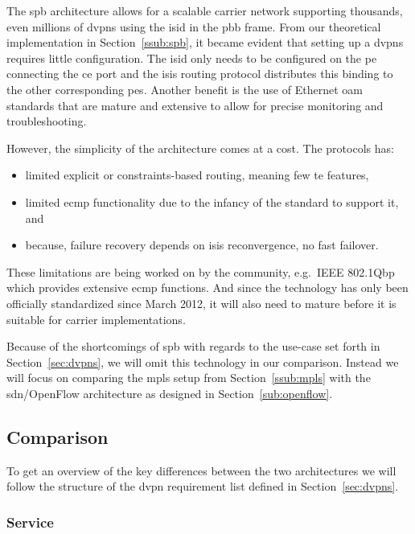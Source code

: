 The \ac{spb} architecture allows for a scalable carrier network supporting thousands, even millions of \acp{dvpn} using the \ac{isid} in the \ac{pbb} frame. From our theoretical implementation in Section~\ref{ssub:spb}, it became evident that setting up a \acp{dvpn} requires little configuration. The \ac{isid} only needs to be configured on the \ac{pe} connecting the \ac{ce} port and the \ac{isis} routing protocol distributes this binding to the other corresponding \acp{pe}. Another benefit is the use of Ethernet \ac{oam} standards that are mature and extensive to allow for precise monitoring and troubleshooting.

However, the simplicity of the architecture comes at a cost. The protocols has:
\begin{itemize}
	\item limited explicit or constraints-based routing, meaning few \ac{te} features,
	\item limited \ac{ecmp} functionality due to the infancy of the standard to support it, and
	\item because, failure recovery depends on \ac{isis} reconvergence, no fast failover.
\end{itemize}

These limitations are being worked on by the community, e.g.\ IEEE 802.1Qbp which provides extensive \ac{ecmp} functions. And since the technology has only been officially standardized since March 2012, it will also need to mature before it is suitable for carrier implementations.  

Because of the shortcomings of \ac{spb} with regards to the use-case set forth in Section~\ref{sec:dvpns}, we will omit this technology in our comparison. Instead we will focus on comparing the \ac{mpls} setup from Section~\ref{ssub:mpls} with the \acs{sdn}/OpenFlow architecture as designed in Section~\ref{sub:openflow}.


\subsection{Comparison} %
\label{sub:comparison}

To get an overview of the key differences between the two architectures we will follow the structure of the \ac{dvpn} requirement list defined in Section~\ref{sec:dvpns}. 

\subsubsection{Service} %
\label{ssub:service}


